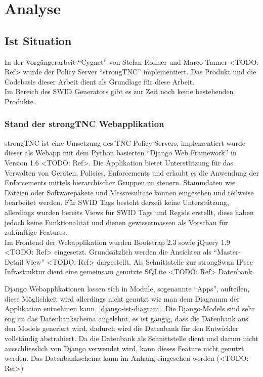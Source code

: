 \chapter{Analyse}

\section{Ist Situation}
In der Vorgängerarbeit \enquote{Cygnet} von Stefan Rohner und Marco Tanner
<TODO: Ref> wurde der Policy Server \enquote{strongTNC} implementiert. Das
Produkt und die Codebasis dieser Arbeit dient als Grundlage für diese Arbeit.\\
Im Bereich des SWID Generators gibt es zur Zeit noch keine bestehenden Produkte.

\subsection{Stand der strongTNC Webapplikation} 
strongTNC ist eine Umsetzung des TNC Policy Servers, implementiert wurde dieser
als Webapp mit dem Python basierten \enquote{Django Web Framework} in Version
1.6 <TODO: Ref>. Die Applikation bietet Unterstützung für das Verwalten von
Geräten, Policies, Enforcements und erlaubt es die Anwendung der Enforcements
mittels hierarchischer Gruppen zu steuern. Stammdaten wie Dateien oder
Softwarepakete und Messresultate können eingesehen und teilweise bearbeitet
werden. Für SWID Tags besteht derzeit keine Unterstützung, allerdings wurden
bereits Views für SWID Tags und Regids erstellt, diese haben jedoch keine
Funktionalität und dienen gewissermassen als Vorschau für zukünftige Features.
\\ Im Frontend der Webapplikation wurden Bootstrap 2.3 sowie jQuery 1.9 <TODO:
Ref> eingesetzt. Grundsätzlich werden die Ansichten als \enquote{Master-Detail
View} <TODO: Ref> dargestellt. Als Schnittstelle zur strongSwan IPsec
Infrastruktur dient eine gemeinsam genutzte SQLite <TODO: Ref> Datenbank.

Django Webapplikationen lassen sich in Module, sogenannte \enquote{Apps},
aufteilen, diese Möglichkeit wird allerdings nicht genutzt wie man dem Diagramm
der Applikation entnehmen kann, \autoref{django-ist-diagram}. Die Django-Models
sind sehr eng an das Datenbankschema angelehnt, es ist gängig, dass die
Datenbank aus den Models generiert wird, dadurch wird die Datenbank für den
Entwickler vollständig abstrahiert. Da die Datenbank als Schnittstelle dient und
darum nicht ausschliesslich von Django verwendet wird, kann dieses Feature nicht
genutzt werden. Das Datenbankschema kann im Anhang eingesehen werden (<TODO:
Ref>)

